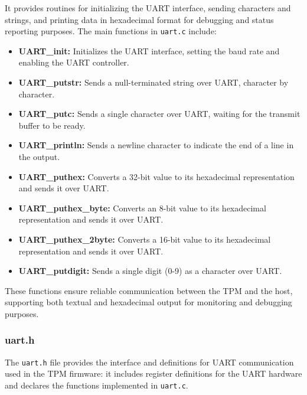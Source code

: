 It provides routines for initializing the UART interface, 
sending characters and strings, and printing data in hexadecimal format
for debugging and status reporting purposes. The main
functions in \texttt{uart.c} include:
\begin{itemize}
    \item \textbf{UART\_init:} Initializes the UART 
    interface, setting the baud rate and enabling the 
    UART controller.
    \item \textbf{UART\_putstr:} Sends a null-terminated 
    string over UART, character by character.
    \item \textbf{UART\_putc:} Sends a single character 
    over UART, waiting for the transmit buffer to be 
    ready.
    \item \textbf{UART\_println:} Sends a newline character 
    to indicate the end of a line in the output.
    \item \textbf{UART\_puthex:} Converts a 32-bit value 
    to its hexadecimal representation and sends it over 
    UART.
    \item \textbf{UART\_puthex\_byte:} Converts an 8-bit 
    value to its hexadecimal representation and sends it 
    over UART.
    \item \textbf{UART\_puthex\_2byte:} Converts a 16-bit 
    value to its hexadecimal representation and sends it 
    over UART.
    \item \textbf{UART\_putdigit:} Sends a single digit 
    (0-9) as a character over UART.
\end{itemize}

These functions ensure reliable communication between the 
TPM and the host, supporting both textual and hexadecimal 
output for monitoring and debugging purposes.

\subsubsection{uart.h}
The \texttt{uart.h} file provides the interface and 
definitions for UART communication used in the TPM 
firmware: it includes register definitions for the UART 
hardware and declares the functions implemented 
in \texttt{uart.c}.



